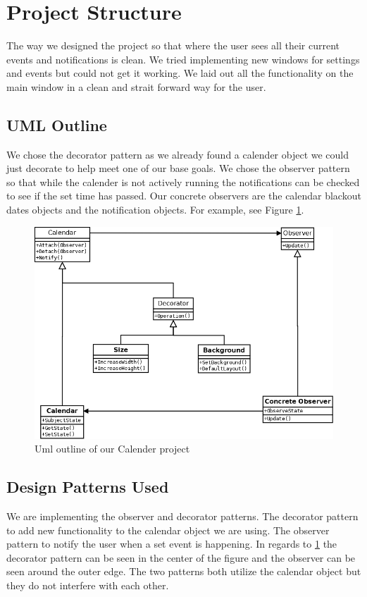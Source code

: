 \documentclass[10pt,conference,onecolumn,compsoc]{IEEEtran}
\begin{document}
\section{Project Structure}
The way we designed the project so that where the user sees all their current events and notifications is clean. We tried implementing new windows for settings and events but could not get it working. We laid out all the functionality on the main window in a clean and strait forward way for the user. 

\subsection{UML Outline}
We chose the decorator pattern as we already found a calender object we could just decorate to help meet one of our base goals. We chose the observer pattern so that while the calender is not actively running the notifications can be checked to see if the set time has passed. Our concrete observers are the calendar blackout dates objects and the notification objects.
For example, see Figure \ref{UML of Calender Project}.

\begin{figure}[ht!]
\includegraphics[scale=0.45]{Uml Format.png}
\caption{Uml outline of our Calender project}
\label{UML of Calender Project}
\end{figure}

\subsection{Design Patterns Used}
We are implementing the observer and decorator patterns. The decorator pattern to add new functionality to the calendar object we are using. The observer pattern to notify the user when a set event is happening. In regards to \ref{UML of Calender Project} the decorator pattern can be seen in the center of the figure and the observer can be seen around the outer edge. The two patterns both utilize the calendar object but they do not interfere with each other. 
\end{document}
